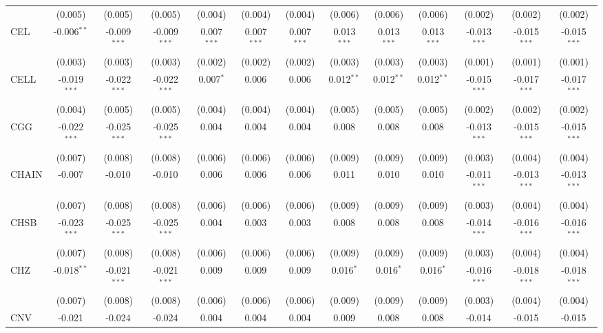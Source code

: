 \begin{table}[!htbp]
\begin{tabular}{@{\extracolsep{5pt}}lcccccccccccc}
  & (0.005) & (0.005) & (0.005) & (0.004) & (0.004) & (0.004) & (0.006) & (0.006) & (0.006) & (0.002) & (0.002) & (0.002) \\
 CEL & -0.006$^{**}$ & -0.009$^{***}$ & -0.009$^{***}$ & 0.007$^{***}$ & 0.007$^{***}$ & 0.007$^{***}$ & 0.013$^{***}$ & 0.013$^{***}$ & 0.013$^{***}$ & -0.013$^{***}$ & -0.015$^{***}$ & -0.015$^{***}$ \\
  & (0.003) & (0.003) & (0.003) & (0.002) & (0.002) & (0.002) & (0.003) & (0.003) & (0.003) & (0.001) & (0.001) & (0.001) \\
 CELL & -0.019$^{***}$ & -0.022$^{***}$ & -0.022$^{***}$ & 0.007$^{*}$ & 0.006$^{}$ & 0.006$^{}$ & 0.012$^{**}$ & 0.012$^{**}$ & 0.012$^{**}$ & -0.015$^{***}$ & -0.017$^{***}$ & -0.017$^{***}$ \\
  & (0.004) & (0.005) & (0.005) & (0.004) & (0.004) & (0.004) & (0.005) & (0.005) & (0.005) & (0.002) & (0.002) & (0.002) \\
 CGG & -0.022$^{***}$ & -0.025$^{***}$ & -0.025$^{***}$ & 0.004$^{}$ & 0.004$^{}$ & 0.004$^{}$ & 0.008$^{}$ & 0.008$^{}$ & 0.008$^{}$ & -0.013$^{***}$ & -0.015$^{***}$ & -0.015$^{***}$ \\
  & (0.007) & (0.008) & (0.008) & (0.006) & (0.006) & (0.006) & (0.009) & (0.009) & (0.009) & (0.003) & (0.004) & (0.004) \\
 CHAIN & -0.007$^{}$ & -0.010$^{}$ & -0.010$^{}$ & 0.006$^{}$ & 0.006$^{}$ & 0.006$^{}$ & 0.011$^{}$ & 0.010$^{}$ & 0.010$^{}$ & -0.011$^{***}$ & -0.013$^{***}$ & -0.013$^{***}$ \\
  & (0.007) & (0.008) & (0.008) & (0.006) & (0.006) & (0.006) & (0.009) & (0.009) & (0.009) & (0.003) & (0.004) & (0.004) \\
 CHSB & -0.023$^{***}$ & -0.025$^{***}$ & -0.025$^{***}$ & 0.004$^{}$ & 0.003$^{}$ & 0.003$^{}$ & 0.008$^{}$ & 0.008$^{}$ & 0.008$^{}$ & -0.014$^{***}$ & -0.016$^{***}$ & -0.016$^{***}$ \\
  & (0.007) & (0.008) & (0.008) & (0.006) & (0.006) & (0.006) & (0.009) & (0.009) & (0.009) & (0.003) & (0.004) & (0.004) \\
 CHZ & -0.018$^{**}$ & -0.021$^{***}$ & -0.021$^{***}$ & 0.009$^{}$ & 0.009$^{}$ & 0.009$^{}$ & 0.016$^{*}$ & 0.016$^{*}$ & 0.016$^{*}$ & -0.016$^{***}$ & -0.018$^{***}$ & -0.018$^{***}$ \\
  & (0.007) & (0.008) & (0.008) & (0.006) & (0.006) & (0.006) & (0.009) & (0.009) & (0.009) & (0.003) & (0.004) & (0.004) \\
 CNV & -0.021$^{}$ & -0.024$^{}$ & -0.024$^{}$ & 0.004$^{}$ & 0.004$^{}$ & 0.004$^{}$ & 0.009$^{}$ & 0.008$^{}$ & 0.008$^{}$ & -0.014$^{}$ & -0.015$^{}$ & -0.015$^{}$ \\

\end{tabular}
\end{table}
